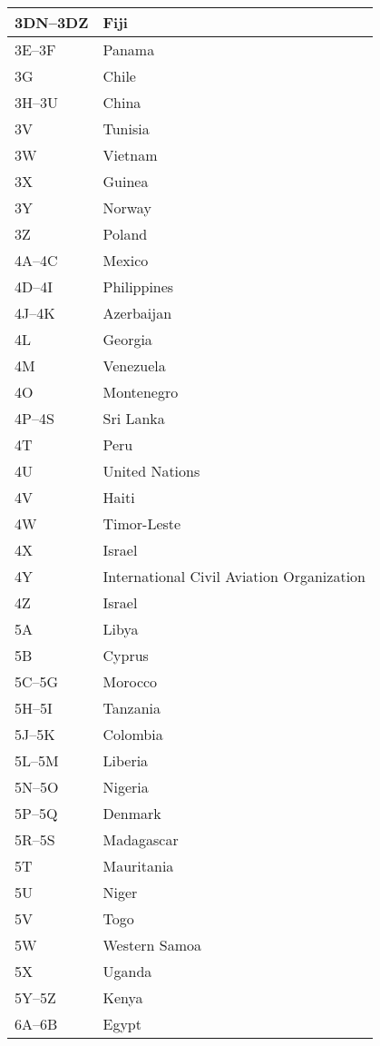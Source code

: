 \begin{longtable}{|l|l|}
	\hline
	3DN--3DZ & Fiji \\
	\hline
	3E--3F & Panama \\
	\hline
	3G & Chile \\
	\hline
	3H--3U & China \\
	\hline
	3V & Tunisia \\
	\hline
	3W & Vietnam \\
	\hline
	3X & Guinea \\
	\hline
	3Y & Norway \\
	\hline
	3Z & Poland \\
	\hline
	4A--4C & Mexico \\
	\hline
	4D--4I & Philippines \\
	\hline
	4J--4K & Azerbaijan \\
	\hline
	4L & Georgia \\
	\hline
	4M & Venezuela \\
	\hline
	4O & Montenegro \\
	\hline
	4P--4S & Sri Lanka \\
	\hline
	4T & Peru \\
	\hline
	4U & United Nations \\
	\hline
	4V & Haiti \\
	\hline
	4W & Timor-Leste \\
	\hline
	4X & Israel \\
	\hline
	4Y & International Civil Aviation Organization \\
	\hline
	4Z & Israel \\
	\hline
	5A & Libya \\
	\hline
	5B & Cyprus \\
	\hline
	5C--5G & Morocco \\
	\hline
	5H--5I & Tanzania \\
	\hline
	5J--5K & Colombia \\
	\hline
	5L--5M & Liberia \\
	\hline
	5N--5O & Nigeria \\
	\hline
	5P--5Q & Denmark \\
	\hline
	5R--5S & Madagascar \\
	\hline
	5T & Mauritania \\
	\hline
	5U & Niger \\
	\hline
	5V & Togo \\
	\hline
	5W & Western Samoa \\
	\hline
	5X & Uganda \\
	\hline
	5Y--5Z & Kenya \\
	\hline
	6A--6B & Egypt \\

\end{longtable}
